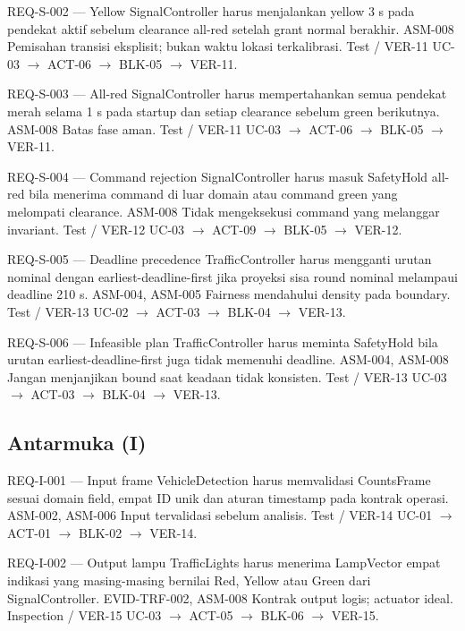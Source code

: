 \requirementcard
{REQ-S-002 --- Yellow}
{SignalController harus menjalankan yellow 3 s pada pendekat aktif sebelum clearance all-red setelah grant normal berakhir.}
{ASM-008}
{Pemisahan transisi eksplisit; bukan waktu lokasi terkalibrasi.}
{Test / VER-11}
{UC-03 $\rightarrow$ ACT-06 $\rightarrow$ BLK-05 $\rightarrow$ VER-11.}

\requirementcard
{REQ-S-003 --- All-red}
{SignalController harus mempertahankan semua pendekat merah selama 1 s pada startup dan setiap clearance sebelum green berikutnya.}
{ASM-008}
{Batas fase aman.}
{Test / VER-11}
{UC-03 $\rightarrow$ ACT-06 $\rightarrow$ BLK-05 $\rightarrow$ VER-11.}

\requirementcard
{REQ-S-004 --- Command rejection}
{SignalController harus masuk SafetyHold all-red bila menerima command di luar domain atau command green yang melompati clearance.}
{ASM-008}
{Tidak mengeksekusi command yang melanggar invariant.}
{Test / VER-12}
{UC-03 $\rightarrow$ ACT-09 $\rightarrow$ BLK-05 $\rightarrow$ VER-12.}

\requirementcard
{REQ-S-005 --- Deadline precedence}
{TrafficController harus mengganti urutan nominal dengan earliest-deadline-first jika proyeksi sisa round nominal melampaui deadline 210 s.}
{ASM-004, ASM-005}
{Fairness mendahului density pada boundary.}
{Test / VER-13}
{UC-02 $\rightarrow$ ACT-03 $\rightarrow$ BLK-04 $\rightarrow$ VER-13.}

\requirementcard
{REQ-S-006 --- Infeasible plan}
{TrafficController harus meminta SafetyHold bila urutan earliest-deadline-first juga tidak memenuhi deadline.}
{ASM-004, ASM-008}
{Jangan menjanjikan bound saat keadaan tidak konsisten.}
{Test / VER-13}
{UC-03 $\rightarrow$ ACT-03 $\rightarrow$ BLK-04 $\rightarrow$ VER-13.}

\subsection{Antarmuka (I)}

\requirementcard
{REQ-I-001 --- Input frame}
{VehicleDetection harus memvalidasi CountsFrame sesuai domain field, empat ID unik dan aturan timestamp pada kontrak operasi.}
{ASM-002, ASM-006}
{Input tervalidasi sebelum analisis.}
{Test / VER-14}
{UC-01 $\rightarrow$ ACT-01 $\rightarrow$ BLK-02 $\rightarrow$ VER-14.}

\requirementcard
{REQ-I-002 --- Output lampu}
{TrafficLights harus menerima LampVector empat indikasi yang masing-masing bernilai Red, Yellow atau Green dari SignalController.}
{EVID-TRF-002, ASM-008}
{Kontrak output logis; actuator ideal.}
{Inspection / VER-15}
{UC-03 $\rightarrow$ ACT-05 $\rightarrow$ BLK-06 $\rightarrow$ VER-15.}

